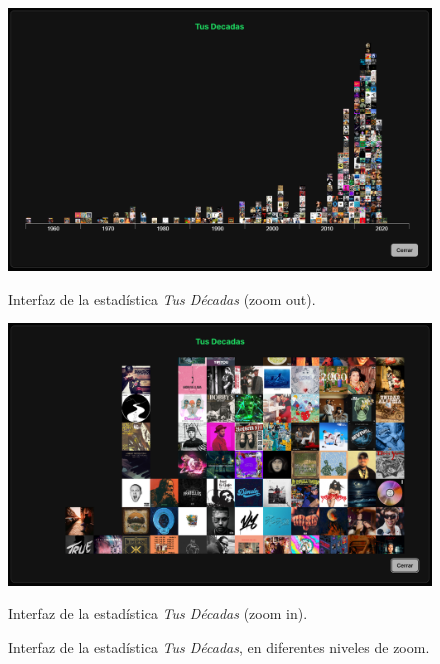 \begin{figure}[H]
    \centering
    \vspace{-10pt}
    \begin{minipage}{0.47\textwidth}
        \centering
        \includegraphics[width=\textwidth]{figures/capturas_ui/tus_decadas_out.png}
        \caption{Interfaz de la estadística \textit{Tus Décadas} (zoom out).}
        \label{fig:tus_decadas_out}
    \end{minipage}
    \begin{minipage}{0.47\textwidth}
        \centering
        \includegraphics[width=\textwidth]{figures/capturas_ui/tus_decadas_zoom.png}
        \caption{Interfaz de la estadística \textit{Tus Décadas} (zoom in).}
        \label{fig:tus_decadas_zoom}
    \end{minipage}
    \caption{Interfaz de la estadística \textit{Tus Décadas}, en diferentes niveles de zoom.}
    \label{fig:tus_decadas}
\end{figure}

